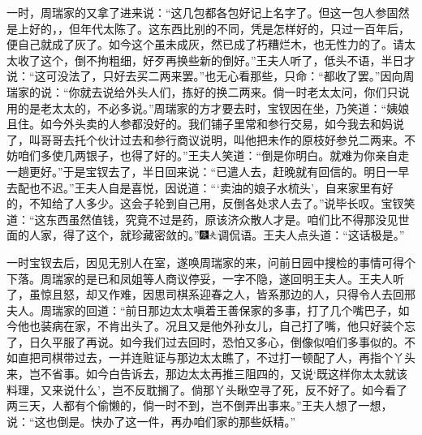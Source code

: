 一时，周瑞家的又拿了进来说：``这几包都各包好记上名字了。但这一包人参固然是上好的，，但年代太陈了。这东西比别的不同，凭是怎样好的，只过一百年后，便自己就成了灰了。如今这个虽未成灰，然已成了朽糟烂木，也无性力的了。请太太收了这个，倒不拘粗细，好歹再换些新的倒好。''王夫人听了，低头不语，半日才说：``这可没法了，只好去买二两来罢。''也无心看那些，只命：``都收了罢。''因向周瑞家的说：``你就去说给外头人们，拣好的换二两来。倘一时老太太问，你们只说用的是老太太的，不必多说。''周瑞家的方才要去时，宝钗因在坐，乃笑道：``姨娘且住。如今外头卖的人参都没好的。我们铺子里常和参行交易，如今我去和妈说了，叫哥哥去托个伙计过去和参行商议说明，叫他把未作的原枝好参兑二两来。不妨咱们多使几两银子，也得了好的。''王夫人笑道：``倒是你明白。就难为你亲自走一趟更好。''于是宝钗去了，半日回来说：``已遣人去，赶晚就有回信的。明日一早去配也不迟。''王夫人自是喜悦，因说道：```卖油的娘子水梳头'，自来家里有好的，不知给了人多少。这会子轮到自己用，反倒各处求人去了。''说毕长叹。宝钗笑道：``这东西虽然值钱，究竟不过是药，原该济众散人才是。咱们比不得那没见世面的人家，得了这个，就珍藏密敛的。''{\includegraphics[width=3mm]{../Images/00004}\includegraphics[width=3mm]{../Images/00012}\footnotesize \kaishu 调侃语。}王夫人点头道：``这话极是。''

一时宝钗去后，因见无别人在室，遂唤周瑞家的来，问前日园中搜检的事情可得个下落。周瑞家的是已和凤姐等人商议停妥，一字不隐，遂回明王夫人。王夫人听了，虽惊且怒，却又作难，因思司棋系迎春之人，皆系那边的人，只得令人去回邢夫人。周瑞家的回道：``前日那边太太嗔着王善保家的多事，打了几个嘴巴子，如今他也装病在家，不肯出头了。况且又是他外孙女儿，自己打了嘴，他只好装个忘了，日久平服了再说。如今我们过去回时，恐怕又多心，倒像似咱们多事似的。不如直把司棋带过去，一并连赃证与那边太太瞧了，不过打一顿配了人，再指个丫头来，岂不省事。如今白告诉去，那边太太再推三阻四的，又说`既这样你太太就该料理，又来说什么'，岂不反耽搁了。倘那丫头瞅空寻了死，反不好了。如今看了两三天，人都有个偷懒的，倘一时不到，岂不倒弄出事来。''王夫人想了一想，说：``这也倒是。快办了这一件，再办咱们家的那些妖精。''


